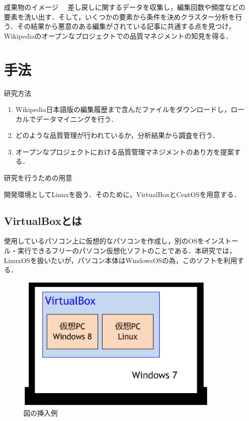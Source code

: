 成果物のイメージ
　差し戻しに関するデータを収集し，編集回数や頻度などの要素を洗い出す．そして，いくつかの要素から条件を決めクラスター分析を行う．その結果から悪意のある編集がされている記事に共通する点を見つけ，Wikipediaのオープンなプロジェクトでの品質マネジメントの知見を得る．




\chapter{手法}

研究方法

\begin{enumerate}
 \item Wikipedia日本語版の編集履歴まで含んだファイルをダウンロードし，ローカルでデータマイニングを行う．
 \item どのような品質管理が行われているか，分析結果から調査を行う．
 \item オープンなプロジェクトにおける品質管理マネジメントのあり方を提案する．
\end{enumerate}

研究を行うための用意

開発環境としてLinuxを扱う．そのために，VirtualBoxとCentOSを用意する． 



\section{VirtualBoxとは}

使用しているパソコン上に仮想的なパソコンを作成し，別のOSをインストール・実行できるフリーのパソコン仮想化ソフトのことである．本研究では，LinuxOSを扱いたいが，パソコン本体はWindowsOSの為，このソフトを利用する．


\begin{figure}[H]
\centering
\includegraphics[width=10cm]{sample10.png}
\caption{図の挿入例}\label{サンプル図}
\end{figure}





